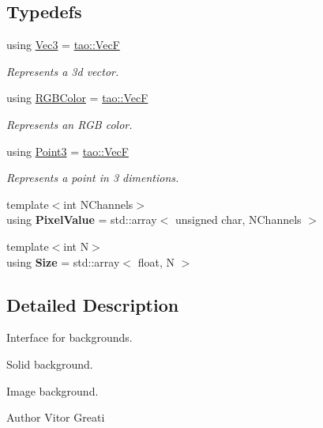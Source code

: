 \subsection*{Typedefs}
\begin{DoxyCompactItemize}
\item 
\mbox{\label{namespaceomg_acf927839a305877d454c507f0b96730b}} 
using \mbox{\hyperlink{namespaceomg_acf927839a305877d454c507f0b96730b}{Vec3}} = \mbox{\hyperlink{namespacetao_acdec2e843192294a6f3d4ab911c6cbae}{tao\+::\+VecF}}
\begin{DoxyCompactList}\small\item\em Represents a 3d vector. \end{DoxyCompactList}\item 
\mbox{\label{namespaceomg_a92d9bbc48ad35def2aa4b0ac3a5b22ae}} 
using \mbox{\hyperlink{namespaceomg_a92d9bbc48ad35def2aa4b0ac3a5b22ae}{R\+G\+B\+Color}} = \mbox{\hyperlink{namespacetao_acdec2e843192294a6f3d4ab911c6cbae}{tao\+::\+VecF}}
\begin{DoxyCompactList}\small\item\em Represents an R\+GB color. \end{DoxyCompactList}\item 
\mbox{\label{namespaceomg_af3df7d66f0c70fe64649fcbe00edba5e}} 
using \mbox{\hyperlink{namespaceomg_af3df7d66f0c70fe64649fcbe00edba5e}{Point3}} = \mbox{\hyperlink{namespacetao_acdec2e843192294a6f3d4ab911c6cbae}{tao\+::\+VecF}}
\begin{DoxyCompactList}\small\item\em Represents a point in 3 dimentions. \end{DoxyCompactList}\item 
\mbox{\label{namespaceomg_adfd06c82d92702d5d6411fb77c25af04}} 
{\footnotesize template$<$int N\+Channels$>$ }\\using {\bfseries Pixel\+Value} = std\+::array$<$ unsigned char, N\+Channels $>$
\item 
\mbox{\label{namespaceomg_a3f437d3821402dd1b1d1ddb5c73f6597}} 
{\footnotesize template$<$int N$>$ }\\using {\bfseries Size} = std\+::array$<$ float, N $>$
\end{DoxyCompactItemize}


\subsection{Detailed Description}
Interface for backgrounds. 

Solid background.

Image background.

\begin{DoxyAuthor}{Author}
Vitor Greati 
\end{DoxyAuthor}
